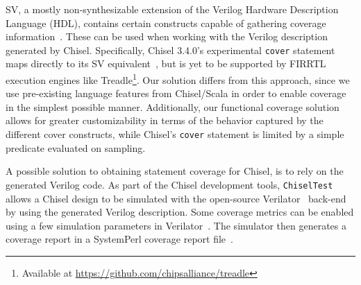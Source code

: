 \documentclass[conference]{IEEEtran}
\begin{document}
SV, a mostly non-synthesizable extension of the Verilog Hardware Description Language (HDL), contains certain constructs capable of gathering coverage information~\cite{spear2008systemverilog}. These can be used when working with the Verilog description generated by Chisel. Specifically, Chisel 3.4.0's experimental \texttt{cover} statement maps directly to its SV equivalent~\cite{chisel3.4release_notes}, but is yet to be supported by FIRRTL execution engines like Treadle\footnote{Available at \url{https://github.com/chipsalliance/treadle}}. %
Our solution differs from this approach, since we use pre-existing language features from Chisel/Scala in order to enable coverage in the simplest possible manner. Additionally, our functional coverage solution allows for greater customizability in terms of the behavior captured by the different cover constructs, while Chisel's \texttt{cover} statement is limited by a simple predicate evaluated on sampling.   
  
A possible solution to obtaining statement coverage for Chisel, is to rely on the generated Verilog code. 
As part of the Chisel development tools, \texttt{ChiselTest} allows a Chisel design to be simulated with the open-source Verilator~\cite{verilator} back-end by using the generated Verilog description.
Some coverage metrics can be enabled using a few simulation parameters in Verilator~\cite{tolotto2020}.
The simulator then generates a coverage report in a SystemPerl coverage report file~\cite{SystemPerl}.
\end{document}
